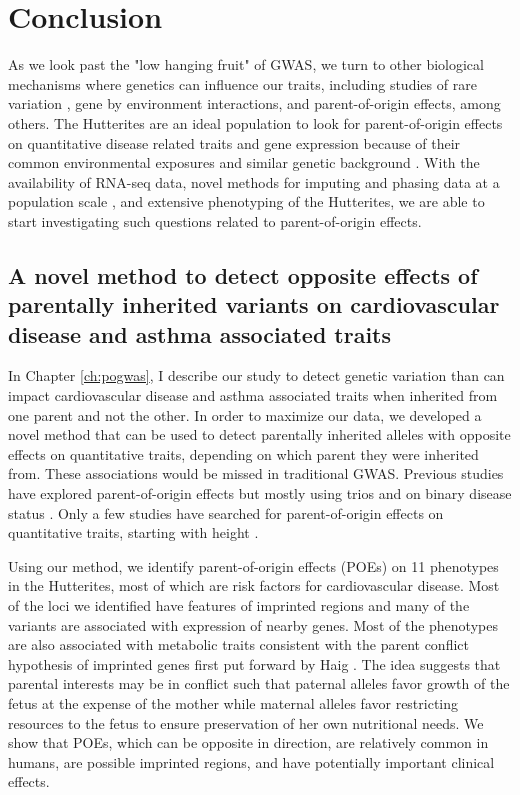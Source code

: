 \chapter{Conclusion}

As we look past the "low hanging fruit" of GWAS, we turn to other biological mechanisms where genetics can influence our traits, including studies of rare variation \citep{Igartua:2017ir,Li:2017bq}, gene by environment interactions, and parent-of-origin effects, among others. The Hutterites are an ideal population to look for parent-of-origin effects on quantitative disease related traits and gene expression because of their common environmental exposures and similar genetic background \cite{Weiss:2005cq,Abney2001,Ober:2001dy}. With the availability of RNA-seq data, novel methods for imputing and phasing data at a population scale \citep {Livne2015}, and extensive phenotyping of the Hutterites, we are able to start investigating such questions related to parent-of-origin effects. 



\section{A novel method to detect opposite effects of parentally inherited variants on cardiovascular disease and asthma associated traits}
 
 In Chapter \ref{ch:pogwas}, I describe our study to detect genetic variation than can impact cardiovascular disease and asthma associated traits when inherited from one parent and not the other. In order to maximize our data, we developed a novel method that can be used to detect parentally inherited alleles with opposite effects on quantitative traits, depending on which parent they were inherited from. These associations would be missed in traditional GWAS. Previous studies have explored parent-of-origin effects but mostly using trios \cite{Garg2012a,Ainsworth:2010bp,Howey:2012hj} and on binary disease status \cite{Kong:2009kk,Ainsworth:2010bp}. Only a few studies have searched for parent-of-origin effects on quantitative traits, starting with height \cite{Benonisdottir:2016dz,Zoledziewska:2015do}.
 
Using our method, we identify parent-of-origin effects (POEs) on 11 phenotypes in the Hutterites, most of which are risk factors for cardiovascular disease. Most of the loci we identified have features of imprinted regions and many of the variants are associated with expression of nearby genes. Most of the phenotypes are also associated with metabolic traits consistent with the parent conflict hypothesis of imprinted genes first put forward by Haig \citep{Haig:2000if,Barlow:2014dv,Patten:2016cb}. The idea suggests that parental interests may be in conflict such that paternal alleles favor growth of the fetus at the expense of the mother while maternal alleles favor restricting resources to the fetus to ensure preservation of her own nutritional needs. We show that POEs, which can be opposite in direction, are relatively common in humans, are possible imprinted regions, and have potentially important clinical effects. 
 
